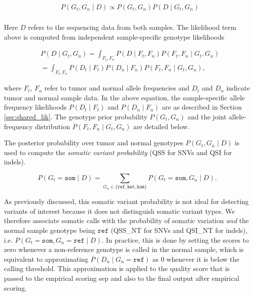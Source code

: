 \documentclass{article}
\begin{document}
\begin{align*}
	& P(G_t,G_n \mid D) \propto P(G_t,G_n) P(D \mid G_t,G_n) \\
\end{align*}


Here $D$ refers to the sequencing data from both samples. The likelihood term above is computed from independent sample-specific genotype likelihoods

\begin{align*}
	& P(D \mid G_t,G_n) = \int_{F_t,F_n}{P(D \mid F_t,F_n)P(F_t,F_n \mid G_t,G_n)} \\
	& = \int_{F_t,F_n}{P(D_t \mid F_t)P(D_n \mid F_n)P(F_t,F_n \mid G_t,G_n)},
\end{align*}

\noindent where $F_t$, $F_n$ refer to tumor and normal allele frequencies and $D_t$ and $D_n$ indicate tumor and normal sample data. In the above equation, the sample-specific allele frequency likelihoods $P(D_t \mid F_t)$ and $P(D_n \mid F_n)$ are as described in Section \ref{sec:shared_lik}. The genotype prior probability $P(G_t, G_n)$ and the joint allele-frequency distribution $P(F_t,F_n \mid G_t,G_n)$ are detailed below.

The posterior probability over tumor and normal genotypes $P(G_t,G_n \mid D)$ is used to compute the {\em somatic variant probability} (QSS for SNVs and QSI for indels).

\begin{equation}
\label{eqn:somVarProb}
	P(G_t = \texttt{som} \mid D) = \sum_{G_n \in \{ \texttt{ref}, \texttt{het}, \texttt{hom} \}}{P(G_t=\texttt{som},G_n \mid D)}.
\end{equation}

As previously discussed, this somatic variant probability is not ideal for detecting variants of interest because it does not distinguish somatic variant types. We therefore associate somatic calls with the probability of somatic variation {\em and} the normal sample genotype being $\texttt{ref}$ (QSS\_NT for SNVs and QSI\_NT for indels), i.e. $P(G_t = \texttt{som}, G_n = \texttt{ref} \mid D)$. In practice, this is done by setting the scores to zero whenever a non-reference genotype is called in the normal sample, which is equivalent to approximating $P(D_n \mid G_n = \texttt{ref})$ as $0$ whenever it is below the calling threshold. This approximation is applied to the quality score that is passed to the empirical scoring sep and also to the final output after empirical scoring.
\end{document}
